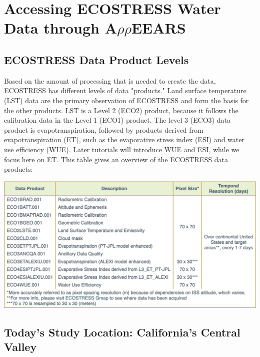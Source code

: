 \documentclass[oneside,a4paper,11pt,explicit]{book}
\begin{document}
\section{Accessing ECOSTRESS Water Data through A$\rho\rho$EEARS}

\subsection{ECOSTRESS Data Product Levels}

Based on the amount of processing that is needed to create the data, ECOSTRESS has different levels of data "products." Land surface temperature (LST) data are the primary observation of ECOSTRESS and form the basis for the other products. LST is a Level 2 (ECO2) product, because it follows the calibration data in the Level 1 (ECO1) product. The level 3 (ECO3) data product is evapotranspiration, followed by products derived from evapotranspiration (ET), such as the evaporative stress index (ESI) and water use efficiency (WUE). Later tutorials will introduce WUE and ESI, while we focus here on ET. This table gives an overview of the ECOSTRESS data products: 

\vspace{.5em}

\centerline{\includegraphics[width=.75\textwidth]{ECOSTRESS_DataProducts.png}}

\vspace{.5em}

\subsection{Today's Study Location: California's Central Valley}
\end{document}
